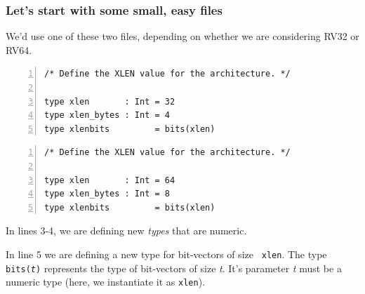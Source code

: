 \documentclass[aspectratio=169]{beamer}
\newcommand{\slidefont}{\scriptsize}
\newcommand{\cf}{\scriptsize\tt}
\begin{document}
\begin{frame}[fragile]
  \frametitle{Let's start with some small, easy files}

  \slidefont

  We'd use one of these two files, depending on whether we are considering RV32 or RV64.

  \begin{Verbatim}[frame=single, numbers=left, label = File riscv\_xlen32.sail]
/* Define the XLEN value for the architecture. */

type xlen       : Int = 32
type xlen_bytes : Int = 4
type xlenbits         = bits(xlen)
  \end{Verbatim}

  \begin{Verbatim}[frame=single, numbers=left, label = File riscv\_xlen64.sail]
/* Define the XLEN value for the architecture. */

type xlen       : Int = 64
type xlen_bytes : Int = 8
type xlenbits         = bits(xlen)
  \end{Verbatim}

  \begin{minipage}{\textwidth}
    In lines 3-4, we are defining new \emph{types} that are numeric.

    \vspace{1ex}

    In line 5 we are defining a new type for bit-vectors of size {\cf
      xlen}.  The type {\cf bits(\emph{t})} represents the type of
    bit-vectors of size \emph{t}.  It's parameter \emph{t} must be a
    numeric type (here, we instantiate it as {\cf xlen}).
  \end{minipage}

\end{frame}



\end{document}
